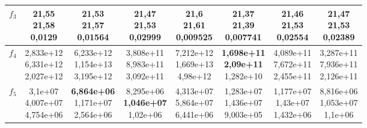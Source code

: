 \begin{table}[t]
\begin{small}
\begin{tabular}{|c|c|c|c|c|c|c|c|}
        $f_3$    & \makecell{21,55 \\ 21,58 \\ 0,0129}            & \makecell{21,53 \\ 21,57 \\ 0,01564}           & \makecell{21,47 \\ 21,53 \\ 0,02999}           & \makecell{21,6 \\ 21,61 \\ 0,009525}          & \makecell{\textbf{21,37} \\ \textbf{21,39} \\ 0,007741}          & \makecell{21,46 \\ 21,53 \\ 0,02554}           & \makecell{21,47 \\ 21,53 \\ 0,02389}           \\\hline
        $f_4$    & \makecell{2,833e+12 \\ 6,331e+12 \\ 2,027e+12} & \makecell{6,233e+12 \\ 1,154e+13 \\ 3,195e+12} & \makecell{3,808e+11 \\ 8,983e+11 \\ 3,092e+11} & \makecell{7,212e+12 \\ 1,669e+13 \\ 4,98e+12}  & \makecell{\textbf{1,698e+11} \\ \textbf{2,09e+11} \\ 1,282e+10}  & \makecell{4,089e+11 \\ 7,672e+11 \\ 2,455e+11} & \makecell{3,287e+11 \\ 7,936e+11 \\ 2,126e+11} \\\hline
        $f_5$    & \makecell{3,1e+07 \\ 4,007e+07 \\ 4,754e+06}   & \makecell{\textbf{6,864e+06} \\ 1,171e+07 \\ 2,564e+06} & \makecell{8,295e+06 \\ \textbf{1,046e+07} \\ 1,02e+06}  & \makecell{4,313e+07 \\ 5,864e+07 \\ 6,441e+06} & \makecell{1,283e+07 \\ 1,436e+07 \\ 9,003e+05} & \makecell{1,177e+07 \\ 1,43e+07 \\ 1,432e+06}  & \makecell{8,816e+06 \\ 1,053e+07 \\ 1,1e+06}   \\\hline

\end{tabular}
\end{small}
\end{table}
